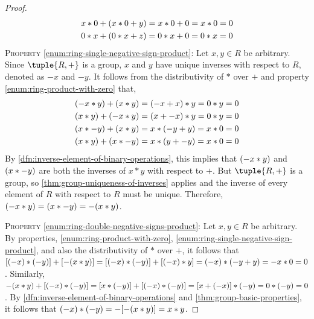 \begin{proof}
\begin{gather*}
        x \ast 0 + \mleft( x \ast 0 + y \mright) = x \ast 0 + 0 = x \ast 0 = 0\\
        0 \ast x + \mleft( 0 \ast x + z \mright) = 0 \ast x + 0 = 0 \ast x = 0
    \end{gather*}
    \noindent
    \textsc{Property} \ref{enum:ring-single-negative-sign-product}:
    Let \( x,y \in R \) be arbitrary. Since \( \tuple{R,+} \) is a group, \( x \) and \( y \) have unique inverses with respect to \( R \),
    denoted as \( -x \) and \( -y \). It follows from the distributivity of \( \ast \) over \( + \) and property \ref{enum:ring-product-with-zero} that,
    \begin{gather*}
        \mleft( -x \ast y \mright) + \mleft( x \ast y \mright) = \mleft( -x + x \mright) \ast y = 0 \ast y = 0 \\
        \mleft( x \ast y \mright) + \mleft( -x \ast y \mright) = \mleft( x + -x \mright) \ast y = 0 \ast y = 0 \\
        \mleft( x \ast -y \mright) + \mleft( x \ast y \mright) = x \ast \mleft( -y + y \mright) = x \ast 0 = 0 \\
        \mleft( x \ast y \mright) + \mleft( x \ast -y \mright) = x \ast \mleft( y + -y \mright) = x \ast 0 = 0
    \end{gather*}
    By \cref{dfn:inverse-element-of-binary-operations}, this implies that \( \mleft( -x \ast y \mright) \) and \( \mleft( x \ast -y \mright) \) are both the inverses of
    \( x \ast y \) with respect to \( + \). But \( \tuple{R, +} \) is a group, so \cref{thm:group-uniqueness-of-inverses} applies and the inverse of every element of \( R \)
    with respect to \( R \) must be unique. Therefore, \( \mleft( -x \ast y \mright) = \mleft( x \ast -y \mright) = - \mleft( x \ast y \mright) \).

    \vspace{0.3cm}
    \noindent
    \textsc{Property} \ref{enum:ring-double-negative-signs-product}:
    Let \( x,y \in R \) be arbitrary. By properties, \ref{enum:ring-product-with-zero}, \ref{enum:ring-single-negative-sign-product},
    and also the distributivity of \( \ast \) over \( + \), it follows that
    \( \mleft[ \mleft( -x \mright) \ast \mleft( -y \mright) \mright] + \mleft[ - \mleft( x \ast y \mright) \mright]
       = \mleft[ \mleft( -x \mright) \ast \mleft( -y \mright) \mright] + \mleft[ \mleft( -x \mright) \ast y \mright]
       = \mleft( -x \mright) \ast \mleft( -y + y \mright) = -x \ast 0 = 0 \).
    Similarly, \( -\mleft( x \ast y \mright) + \mleft[ \mleft( -x \mright) \ast \mleft( -y \mright) \mright]
        = \mleft[ x \ast \mleft( -y \mright) \mright] + \mleft[ \mleft( -x \mright) \ast \mleft( -y \mright) \mright]
        = \mleft[ x + \mleft( -x \mright) \mright] \ast \mleft( -y \mright)
        = 0 \ast \mleft( -y \mright)
        = 0
    \).
    By \cref{dfn:inverse-element-of-binary-operations} and \cref{thm:group-basic-properties}, it follows that
    \( \mleft( -x \mright) \ast \mleft( -y \mright) = - \mleft[ - \mleft( x \ast y \mright) \mright] = x \ast y \).


\end{proof}
